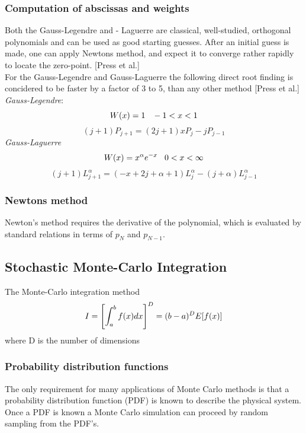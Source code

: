 \documentclass[%
reprint,
amsmath,amssymb,
aps,
]{revtex4-1}
\begin{document}
\subsubsection{Computation of abscissas and weights}
Both the Gauss-Legendre and - Laguerre are classical, well-studied, orthogonal polynomials and can be used as good starting guesses. After an initial guess is made, one can apply Newtons method, and expect  it to converge rather rapidly to locate the zero-point. [Press et al.] \\
For the Gauss-Legendre and Gauss-Laguerre the following direct root finding is concidered to be faster by a factor of 3 to 5, than any other method [Press et al.]\\
\textit{Gauss-Legendre}:
\begin{equation*}
	W(x) = 1 \hspace{3mm} -1 < x < 1 
\end{equation*}
\begin{equation}
	(j+1)P_{j+1} = (2j +1)xP_j - jP_{j-1}
\end{equation}
\textit{Gauss-Laguerre}
\begin{equation*}
W(x) = x^\alpha e^{-x} \hspace{3mm} 0 < x < \infty 
\end{equation*}
\begin{equation}
(j+1)L_{j+1}^\alpha = (-x+2j+\alpha+1)L_j^\alpha -(j+\alpha)L_{j-1}^\alpha
\end{equation}
\subsubsection{Newtons method}
Newton's method requires the derivative of the polynomial, which is evaluated by standard relations in terms of $p_N$ and $p_{N-1}$. 

\subsection{Stochastic Monte-Carlo Integration}
The Monte-Carlo integration method 
\begin{equation}
	I = \qty[\int_{a}^{b}f(x) dx]^D = (b-a)^DE[f(x)]
\end{equation}
where D is the number of dimensions
\subsubsection{Probability distribution functions}
The only requirement for many applications of Monte Carlo methods is that a probability distribution function (PDF) is known to describe the physical system. Once a PDF is known a Monte Carlo simulation can proceed by random sampling from the PDF's. 
\end{document}
